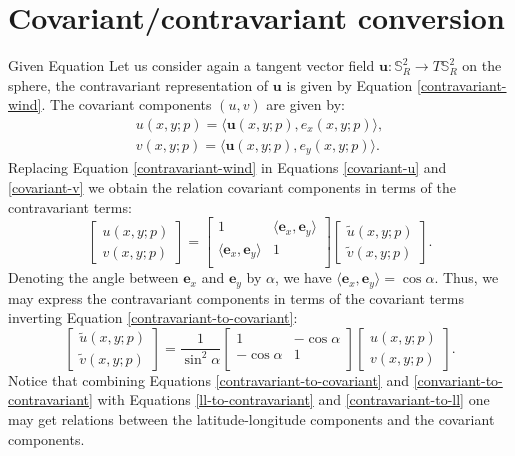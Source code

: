 \section{Covariant/contravariant conversion}
\label{anexo-cov-con}
Given Equation
Let us consider again a tangent vector field $\boldsymbol{u}: \mathbb{S}^2_R \to 
T\mathbb{S}_R^2$ on the sphere, the contravariant representation of 
$\boldsymbol{u}$ is given by Equation \eqref{contravariant-wind}.
The covariant components $(u,v)$ are given by:
\begin{align}
	\label{covariant-u}
	u(x,y;p) = \langle \boldsymbol{u}(x,y;p) , e_x(x,y;p)  \rangle, \\
	\label{covariant-v}
	v(x,y;p) = \langle \boldsymbol{u}(x,y;p) , e_y(x,y;p)  \rangle.
\end{align}
Replacing Equation \eqref{contravariant-wind} in 
Equations \eqref{covariant-u} and \eqref{covariant-v} we obtain
the relation covariant components in terms of the
contravariant terms:
\begin{equation}
	\label{contravariant-to-covariant}
	\begin{bmatrix}
		{u}(x,y;p) \\
		{v}(x,y;p)
	\end{bmatrix}
	=
	\begin{bmatrix}
		1  
		& \langle \boldsymbol{e}_x, \boldsymbol{e}_y \rangle \\
		  \langle \boldsymbol{e}_x, \boldsymbol{e}_y \rangle 
		& 1 \\
	\end{bmatrix}
	\begin{bmatrix}
		\tilde{u} (x,y;p) \\
		\tilde{v} (x,y;p) 
	\end{bmatrix}.
\end{equation}
Denoting the angle between $\boldsymbol{e}_x$ and  $\boldsymbol{e}_y$ by $\alpha$,
we have $\langle \boldsymbol{e}_x, \boldsymbol{e}_y \rangle = \cos \alpha$.
Thus, we may express the contravariant components in terms of 
the covariant terms inverting Equation \eqref{contravariant-to-covariant}:
\begin{equation}
	\label{convariant-to-contravariant}
	\begin{bmatrix}
		\tilde{u}(x,y;p) \\
		\tilde{v}(x,y;p)
	\end{bmatrix}
	= \frac{1}{\sin^2 \alpha}
	\begin{bmatrix}
		1  
		& -\cos \alpha \\
		  -\cos \alpha
		& 1\\
	\end{bmatrix}
	\begin{bmatrix}
		{u} (x,y;p) \\
		{v} (x,y;p) 
	\end{bmatrix}.
\end{equation}
Notice that combining Equations \eqref{contravariant-to-covariant}
and \eqref{convariant-to-contravariant} with Equations 
\eqref{ll-to-contravariant} and \eqref{contravariant-to-ll}
one may get relations between the latitude-longitude 
components and the covariant components.
